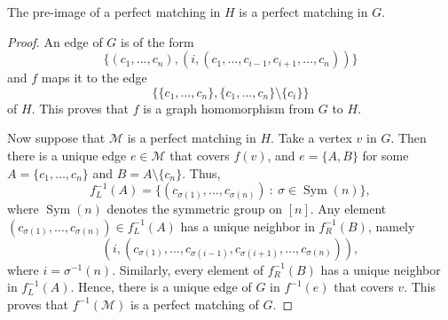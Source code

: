 \documentclass[10pt,a4paper]{amsart}
\DeclareMathOperator{\Sym}{Sym}
\begin{document}
\begin{Lemma}
 The pre-image of a perfect matching in $H$ is a perfect matching in $G$.
\end{Lemma}

\begin{proof}
 An edge of $G$ is of the form
 \[
  \{(c_1,\dots,c_n), (i,(c_1,\dots,c_{i-1},c_{i+1},\dots,c_n))\}
 \]
 and $f$ maps it to the edge
 \[
  \{\{c_1,\dots,c_n\}, \{c_1,\dots,c_n\} \setminus \{c_i\}\}
 \]
 of $H$.
 This proves that $f$ is a graph homomorphism from $G$ to $H$.

 Now suppose that $\mathcal M$ is a perfect matching in $H$.
 Take a vertex $v$ in $G$.
 Then there is a unique edge $e \in \mathcal M$ that covers $f(v)$, and $e = \{A,B\}$ for some $A = \{c_1,\dots,c_n\}$ and $B = A \setminus \{c_n\}$.
 Thus,
 \[
  f_L^{-1}(A) = \{ (c_{\sigma(1)}, \dots, c_{\sigma(n)}) \: : \: \sigma \in \Sym(n) \},
 \]
 where $\Sym(n)$ denotes the symmetric group on $[n]$.
 Any element $(c_{\sigma(1)}, \dots, c_{\sigma(n)}) \in f_L^{-1}(A)$ has a unique neighbor in $f_R^{-1}(B)$, namely
 \[
  (i,(c_{\sigma(1)}, \dots, c_{\sigma(i-1)}, c_{\sigma(i+1)}, \dots, c_{\sigma(n)} )),
 \]
 where $i = \sigma^{-1}(n)$.
 Similarly, every element of $f_R^{-1}(B)$ has a unique neighbor in $f_L^{-1}(A)$.
 Hence, there is a unique edge of $G$ in $f^{-1}(e)$ that covers $v$.
 This proves that $f^{-1}(\mathcal M)$ is a perfect matching of $G$.
\end{proof}
\end{document}
